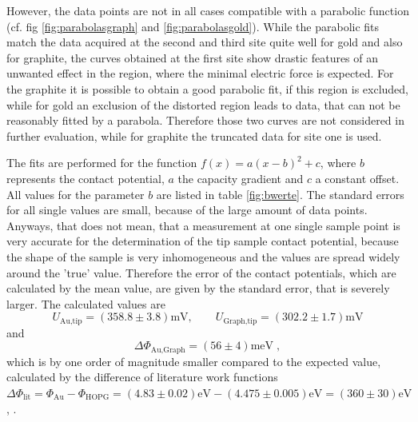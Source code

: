 \documentclass[a4paper]{scrartcl}
\numberwithin{equation}{section}
\numberwithin{figure}{section}
\numberwithin{table}{section}
\newcommand{\eq}[2]{\begin{equation}#1\label{#2}\end{equation}}
\begin{document}
However, the data points are not in all cases compatible with a parabolic function (cf. fig \ref{fig:parabolasgraph} and \ref{fig:parabolasgold}). While the parabolic fits match the data acquired at the second and third site quite well for gold and also for graphite, the curves obtained at the first site show drastic features of an unwanted effect in the region, where the minimal electric force is expected. For the graphite it is possible to obtain a good parabolic fit, if this region is excluded, while for gold an exclusion of the distorted region leads to data, that can not be reasonably fitted by a parabola. Therefore those two curves are not considered in further evaluation, while for graphite the truncated data for site one is used. 

The fits are performed for the function $f(x) = a(x-b)^2 + c$, where $b$ represents the contact potential, $a$ the capacity gradient and $c$ a constant offset. All values for the parameter $b$ are listed in table \ref{fig:bwerte}. The standard errors for all single values are small, because of the large amount of data points. Anyways, that does not mean, that a measurement at one single sample point is very accurate for the determination of the tip sample contact potential, because the shape of the sample is very inhomogeneous and the values are spread widely around the 'true' value. Therefore the error of the contact potentials, which are calculated by the mean value, are given by the standard error, that is severely larger. The calculated values are
\eq{U_\text{Au,tip}= (358.8 \pm 3.8) \text{mV}, \qquad  U_\text{Graph,tip} = (302.2 \pm 1.7) \text{mV}}{}
 and 
 \eq{ \Delta \Phi_\text{Au,Graph} = (56 \pm 4) \text{meV} \; , }{}
which is by one order of magnitude smaller compared to the expected value, calculated by the difference of literature work functions $\Delta \Phi_\text{lit}=\Phi_\text{Au} - \Phi_\text{HOPG} =  (4.83 \pm 0.02) \text{eV} - (4.475 \pm 0.005) \text{eV} = (360 \pm 30) \text{eV}$  \cite{gold}, \cite{HOPG}.

\end{document}

